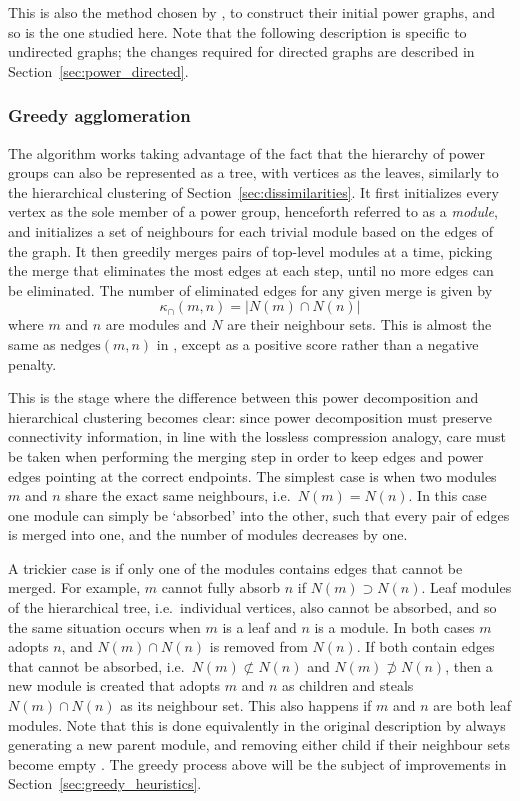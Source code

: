 This is also the method chosen by \citet{Bach2017}, to construct their initial power graphs, and so is the one studied here. Note that the following description is specific to undirected graphs; the changes required for directed graphs are described in Section~\ref{sec:power_directed}.

\subsubsection{Greedy agglomeration}
The algorithm works taking advantage of the fact that the hierarchy of power groups can also be represented as a tree, with vertices as the leaves, similarly to the hierarchical clustering of Section~\ref{sec:dissimilarities}. It first initializes every vertex as the sole member of a power group, henceforth referred to as a \emph{module}, and initializes a set of neighbours for each trivial module based on the edges of the graph.
It then greedily merges pairs of top-level modules at a time, picking the merge that eliminates the most edges at each step, until no more edges can be eliminated.
The number of eliminated edges for any given merge is given by
\begin{equation}
  \kappa_{\cap}(m, n) = |N(m)\cap N(n)|
  \label{eq:kappa_cap}
\end{equation}
where $m$ and $n$ are modules and $N$ are their neighbour sets.
This is almost the same as $\mathrm{nedges}(m,n)$ in \citet{Dwyer2014}, except as a positive score rather than a negative penalty.

This is the stage where the difference between this power decomposition and hierarchical clustering becomes clear: since power decomposition must preserve connectivity information, in line with the lossless compression analogy, care must be taken when performing the merging step in order to keep edges and power edges pointing at the correct endpoints. 
The simplest case is when two modules $m$ and $n$ share the exact same neighbours, i.e.\ $N(m)=N(n)$. In this case one module can simply be `absorbed' into the other, such that every pair of edges is merged into one, and the number of modules decreases by one. 

A trickier case is if only one of the modules contains edges that cannot be merged. For example, $m$ cannot fully absorb $n$ if $N(m)\supset N(n)$. Leaf modules of the hierarchical tree, i.e.\ individual vertices, also cannot be absorbed, and so the same situation occurs when $m$ is a leaf and $n$ is a module. In both cases $m$ adopts $n$, and $N(m)\cap N(n)$ is removed from $N(n)$.
If both contain edges that cannot be absorbed, i.e.\ $N(m)\not\subset N(n)$ and $N(m)\not\supset N(n)$, then a new module is created that adopts $m$ and $n$ as children and steals $N(m)\cap N(n)$ as its neighbour set. This also happens if $m$ and $n$ are both leaf modules.
Note that this is done equivalently in the original description by always generating a new parent module, and removing either child if their neighbour sets become empty \citep{Dwyer2014}.
The greedy process above will be the subject of improvements in Section~\ref{sec:greedy_heuristics}.

